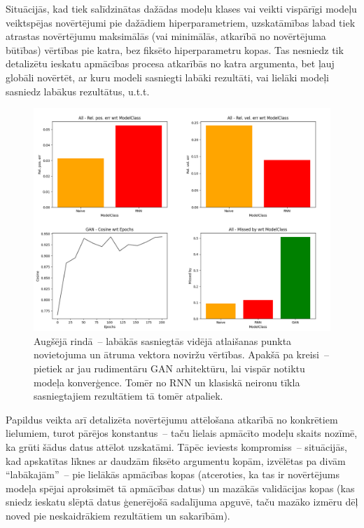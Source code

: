 \documentclass[12pt, a4paper]{article}
\numberwithin{equation}{section} %
\begin{document}
Situācijās, kad tiek salīdzinātas dažādas modeļu klases vai veikti vispārīgi modeļu veiktspējas novērtējumi pie dažādiem hiperparametriem, uzskatāmības labad tiek atrastas novērtējumu maksimālās (vai minimālās, atkarībā no novērtējuma būtības) vērtības pie katra, bez fiksēto hiperparametru kopas. Tas nesniedz tik detalizētu ieskatu apmācības procesa atkarībās no katra argumenta, bet ļauj globāli novērtēt, ar kuru modeli sasniegti labāki rezultāti, vai lielāki modeļi sasniedz labākus rezultātus, u.t.t. 

\begin{figure}[t!]
    \centering
    \includegraphics[width=16cm,page=1]{../img/throw_metrics_gan.png}
    \caption{Augšējā rindā~-- labākās sasniegtās vidējā atlaišanas punkta novietojuma un ātruma vektora noviržu vērtības. Apakšā pa kreisi~-- pietiek ar jau rudimentāru GAN arhitektūru, lai vispār notiktu modeļa konverģence. Tomēr no RNN un klasiskā neironu tīkla sasniegtajiem rezultātiem tā tomēr atpaliek.}
    \label{all_throw}
\end{figure}

Papildus veikta arī detalizēta novērtējumu attēlošana atkarībā no konkrētiem lielumiem, turot pārējos konstantus~-- taču lielais apmācīto modeļu skaits nozīmē, ka grūti šādus datus attēlot uzskatāmi. Tāpēc ieviests kompromiss~-- situācijās, kad apskatītas līknes ar daudzām fiksēto argumentu kopām, izvēlētas pa divām ``labākajām''~-- pie lielākās apmācības kopas (atceroties, ka tas ir novērtējums modeļa spējai aproksimēt tā apmācības datus) un mazākās validācijas kopas (kas sniedz ieskatu slēptā datus ģenerējošā sadalījuma apguvē, taču mazāko izmēru dēļ noved pie neskaidrākiem rezultātiem un sakarībām).
\end{document}
